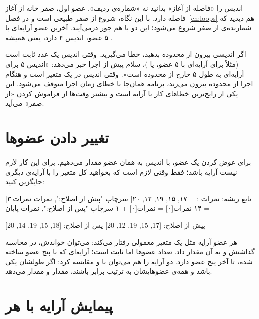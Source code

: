 \begin{note}
اندیس را «فاصله از آغاز» بدانید نه «شماره‌ی ردیف». عضو اول، صفر خانه از
آغاز فاصله دارد. با این نگاه، شروع از صفر طبیعی است و در فصل~\ref{ch:loops} هم دیدید که شمارنده‌ی  از صفر شروع می‌شود؛
این دو با هم جور درمی‌آیند. آخرین عضو آرایه‌ای با ۵ عضو، اندیس ۴ دارد، یعنی
همیشه .
\end{note}

\begin{warn}
اگر اندیسی بیرون از محدوده بدهید، خطا می‌گیرید. وقتی اندیس یک عدد ثابت است
(مثلاً  برای آرایه‌ای با ۵ عضو، یا )، سلام
پیش از اجرا خبر می‌دهد: «اندیس ۵ برای آرایه‌ای به طول ۵ خارج از محدوده است».
وقتی اندیس در یک متغیر است و هنگام اجرا از محدوده بیرون می‌زند، برنامه همان‌جا
با خطای زمان اجرا متوقف می‌شود. این یکی از رایج‌ترین خطاهای کار با آرایه
است و بیشتر وقت‌ها از فراموش کردن «از صفر» می‌آید.
\end{warn}

\section{تغییر دادن عضوها}

برای عوض کردن یک عضو، با اندیس به همان عضو مقدار می‌دهیم. برای این کار
لازم نیست آرایه  باشد؛  فقط وقتی لازم است که
بخواهید کل متغیر را با آرایه‌ی دیگری جایگزین کنید:

\begin{salamfa}
تابع ریشه:
    نمرات := [۱۷, ۱۵, ۱۹, ۱۲, ۲۰]
    سرچاپ "پیش از اصلاح:", نمرات
    نمرات[۳] = ۱۴
    نمرات[۰] = نمرات[۰] + ۱
    سرچاپ "پس از اصلاح:", نمرات
پایان
\end{salamfa}

\begin{outputfa}
پیش از اصلاح: [17, 15, 19, 12, 20]
پس از اصلاح: [18, 15, 19, 14, 20]
\end{outputfa}

هر عضو آرایه مثل یک متغیر معمولی رفتار می‌کند: می‌توان خواندش، در محاسبه
گذاشتش و به آن مقدار داد. تعداد عضوها اما ثابت است؛ آرایه‌ای که با پنج عضو
ساخته شده، تا آخر پنج عضو دارد. دو آرایه را هم می‌توان با  و
 مقایسه کرد: اگر طولشان یکی باشد و همه‌ی عضوهایشان به ترتیب برابر
باشند،  مقدار  و  مقدار  می‌دهد.

\section{پیمایش آرایه با هر}

